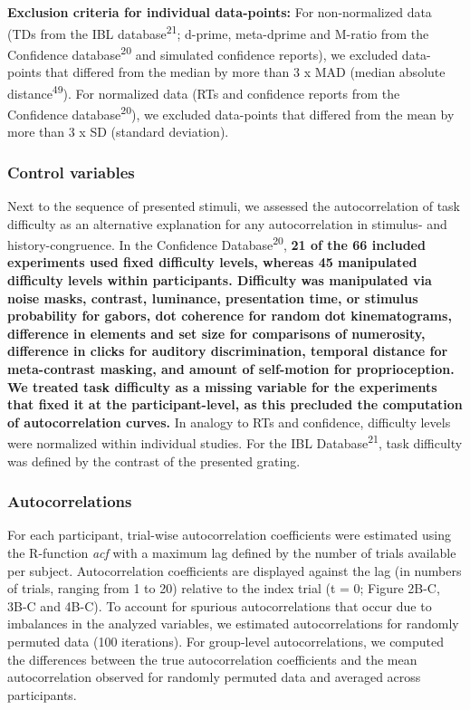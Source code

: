 \documentclass[
]{article}
\begin{document}
\textbf{Exclusion criteria for individual data-points:} For
non-normalized data (TDs from the IBL database\textsuperscript{21};
d-prime, meta-dprime and M-ratio from the Confidence
database\textsuperscript{20} and simulated confidence reports), we
excluded data-points that differed from the median by more than 3 x MAD
(median absolute distance\textsuperscript{49}). For normalized data (RTs
and confidence reports from the Confidence
database\textsuperscript{20}), we excluded data-points that differed
from the mean by more than 3 x SD (standard deviation).

\hypertarget{control-variables}{%
\subsubsection{Control variables}\label{control-variables}}

Next to the sequence of presented stimuli, we assessed the
autocorrelation of task difficulty as an alternative explanation for any
autocorrelation in stimulus- and history-congruence. In the Confidence
Database\textsuperscript{20}, \textbf{21 of the 66 included experiments
used fixed difficulty levels, whereas 45 manipulated difficulty levels
within participants. Difficulty was manipulated via noise masks,
contrast, luminance, presentation time, or stimulus probability for
gabors, dot coherence for random dot kinematograms, difference in
elements and set size for comparisons of numerosity, difference in
clicks for auditory discrimination, temporal distance for meta-contrast
masking, and amount of self-motion for proprioception. We treated task
difficulty as a missing variable for the experiments that fixed it at
the participant-level, as this precluded the computation of
autocorrelation curves.} In analogy to RTs and confidence, difficulty
levels were normalized within individual studies. For the IBL
Database\textsuperscript{21}, task difficulty was defined by the
contrast of the presented grating.

\hypertarget{autocorrelations}{%
\subsubsection{Autocorrelations}\label{autocorrelations}}

For each participant, trial-wise autocorrelation coefficients were
estimated using the R-function \emph{acf} with a maximum lag defined by
the number of trials available per subject. Autocorrelation coefficients
are displayed against the lag (in numbers of trials, ranging from 1 to
20) relative to the index trial (t = 0; Figure 2B-C, 3B-C and 4B-C). To
account for spurious autocorrelations that occur due to imbalances in
the analyzed variables, we estimated autocorrelations for randomly
permuted data (100 iterations). For group-level autocorrelations, we
computed the differences between the true autocorrelation coefficients
and the mean autocorrelation observed for randomly permuted data and
averaged across participants.
\end{document}
